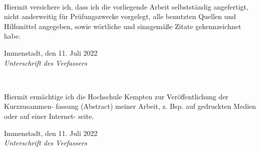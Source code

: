 \newpage
\thispagestyle{empty}


\\ 

\vspace*{2cm}

\noindent
Hiermit versichere ich, dass ich die vorliegende Arbeit selbstständig angefertigt, 
nicht anderweitig für Prüfungszwecke vorgelegt, alle benutzten
Quellen und Hilfsmittel angegeben, sowie wörtliche und sinngemäße Zitate gekennzeichnet habe.
\vspace{2cm}

\noindent
Immenstadt, den 11. Juli 2022
\hspace*{2cm}%
\dotfill\\
\hspace*{8.5cm}%
\textit{Unterschrift des Verfassers}

\vspace*{5cm}

\\ 

\vspace*{2cm}

\noindent
Hiermit ermächtige ich die Hochschule Kempten zur Veröffentlichung der Kurzzusammen-
fassung (Abstract) meiner Arbeit, z. Bsp. auf gedruckten Medien oder auf einer Internet-
seite.
\vspace{2cm}

\noindent
Immenstadt, den 11. Juli 2022
\hspace*{2cm}%
\dotfill\\
\hspace*{8.5cm}%
\textit{Unterschrift des Verfassers}
